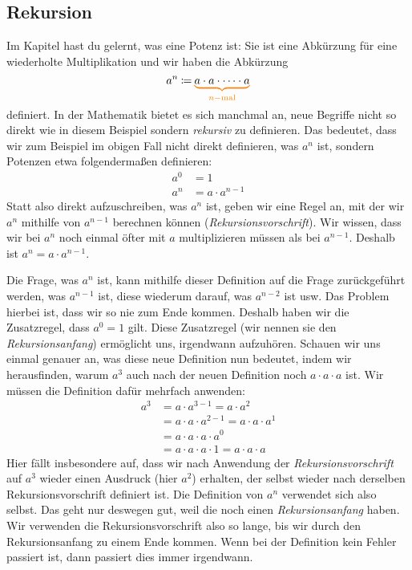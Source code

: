 \documentclass[../../main.tex]{subfiles}
\begin{document}
\subsection*{Rekursion}
Im Kapitel  hast du gelernt, was eine Potenz ist: Sie ist eine Abkürzung für eine wiederholte
Multiplikation und wir haben die Abkürzung
\[a^n\defas\colorbrace{a\cdot a\cdot \dots \cdot a}{n-\text{mal}}\]
definiert. In der Mathematik bietet es sich manchmal an, neue Begriffe nicht so direkt wie in diesem Beispiel sondern
\emph{rekursiv} zu definieren. Das bedeutet, dass wir zum Beispiel im obigen Fall nicht direkt definieren, was $a^n$ ist,
sondern Potenzen etwa folgendermaßen definieren:
\begin{align}
    a^0&=1\\
    a^n&=a\cdot a^{n-1}
\end{align}
Statt also direkt aufzuschreiben, was $a^n$ ist, geben wir eine Regel an, mit der wir $a^n$ mithilfe von $a^{n-1}$
berechnen können (\emph{Rekursionsvorschrift}). Wir wissen, dass wir bei $a^n$ noch einmal öfter mit $a$ multiplizieren
müssen als bei $a^{n-1}$. Deshalb ist $a^n=a\cdot a^{n-1}$. 

Die Frage, was $a^n$ ist, kann mithilfe dieser Definition auf die Frage zurückgeführt werden, was $a^{n-1}$ ist, diese
wiederum darauf, was $a^{n-2}$ ist usw. Das Problem hierbei ist, dass wir so nie zum Ende kommen. Deshalb haben wir die
Zusatzregel, dass $a^0=1$ gilt. Diese Zusatzregel (wir nennen sie den \emph{Rekursionsanfang}) ermöglicht uns,
irgendwann aufzuhören. Schauen wir uns einmal genauer an, was diese neue Definition nun bedeutet, indem wir
herausfinden, warum $a^3$ auch nach der neuen Definition noch $a\cdot a\cdot a$ ist. Wir müssen die Definition dafür
mehrfach anwenden:
\begin{align*}
    a^3&=a\cdot a^{3-1}=a\cdot a^2\\
    &=a\cdot a\cdot a^{2-1}=a\cdot a\cdot a^1\\
    &=a\cdot a\cdot a\cdot a^0\\
    &=a\cdot a\cdot a\cdot 1=a\cdot a\cdot a
\end{align*}
Hier fällt insbesondere auf, dass wir nach Anwendung der \emph{Rekursionsvorschrift} auf $a^3$ wieder einen Ausdruck
(hier $a^2$) erhalten, der selbst wieder nach derselben Rekursionsvorschrift definiert ist. Die Definition von $a^n$
verwendet sich also selbst. Das geht nur deswegen gut, weil die noch einen \emph{Rekursionsanfang} haben. Wir verwenden
die Rekursionsvorschrift also so lange, bis wir durch den Rekursionsanfang zu einem Ende kommen. Wenn bei der Definition
kein Fehler passiert ist, dann passiert dies immer irgendwann.
\end{document}
